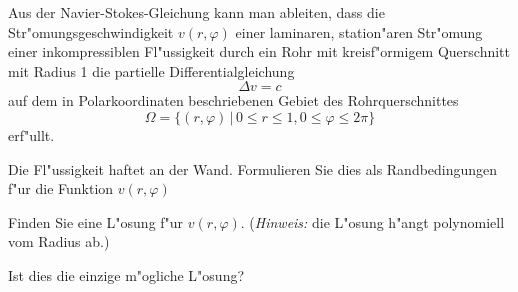 Aus der Navier-Stokes-Gleichung kann man ableiten, dass die
Str"omungsgeschwindigkeit $v(r,\varphi)$ einer laminaren,
station"aren Str"omung einer inkompressiblen Fl"ussigkeit
durch ein Rohr mit kreisf"ormigem Querschnitt mit Radius 1
die partielle Differentialgleichung
\[
\Delta v=c
\]
auf dem in Polarkoordinaten beschriebenen Gebiet des Rohrquerschnittes
\[
\Omega = \{ (r,\varphi)\,|\,0\le r\le 1,0\le \varphi\le 2\pi\}
\]
erf"ullt.
\begin{teilaufgaben}
\item Die Fl"ussigkeit haftet an der Wand. Formulieren Sie dies
als Randbedingungen f"ur die Funktion $v(r,\varphi)$
\item Finden Sie eine L"osung f"ur $v(r,\varphi)$. ({\it Hinweis:}
die L"osung h"angt polynomiell vom Radius ab.)
\item Ist dies die einzige m"ogliche L"osung?
\end{teilaufgaben}

